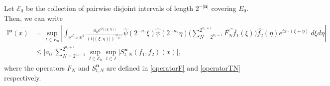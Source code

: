 \documentclass[a4paper,reqno]{amsart}
\numberwithin{equation}{section}
\newcommand{\R}{{\mathbb {R}}}
\begin{document}
	Let $\mathcal{E}_0$ be the collection of pairwise disjoint intervals of length $2^{-|\mathbf{n}|}$ covering $E_0$. Then, we can write
	\begin{align*}
		\mathbb{I}^{\mathbf{n}}(x)&=\sup_{t\in E_0}\left|\int_{\R^d\times\R^d}\frac{a_0 e^{it|(\xi,\eta)|}}{(t|(\xi,\eta)|)^{\frac{2d-1}{2}}}\widehat{\psi}\left(2^{-n_1} \xi\right)\widehat{\psi}\left(2^{-n_2} \eta\right)\Bigg(\sum_{N=2^{n_1-1}}^{2^{n_1+1}}\widehat{F_Nf_1}(\xi)\Bigg)\widehat{f_2}(\eta)e^{ix\cdot(\xi+\eta)}~d\xi d\eta\right|\\
		&\leq |a_0|\sum_{N=2^{n_1-1}}^{2^{n_1+1}}\sup_{I\in\mathcal{E}_0}\sup_{t\in I}\Bigg|S^{\mathbf{n}}_{t,N}(f_1,f_2)(x) \Bigg|,
	\end{align*}
	where the operators $F_N$ and $S^{\mathbf{n}}_{t,N}$ are defined in \eqref{operatorF} and \eqref{operatorTN} respectively.
	
\end{document}
